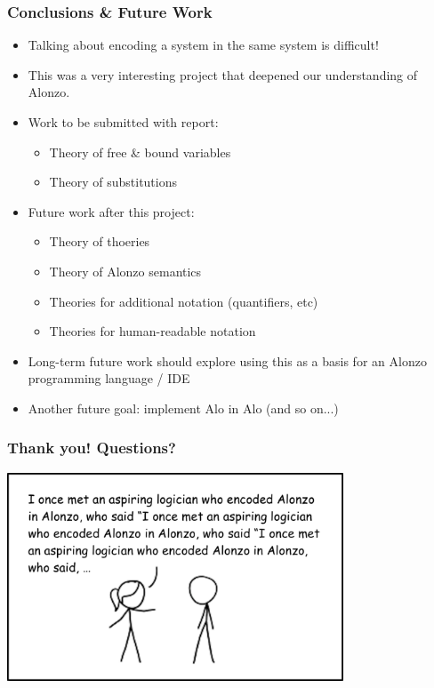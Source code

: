 \documentclass[xcolor={dvipsnames}]{beamer}
\begin{document}
\begin{frame}
\frametitle{Conclusions \& Future Work}
\begin{itemize}
\item Talking about encoding a system in the same system is difficult!
\item This was a very interesting project that deepened our understanding of Alonzo.
\item Work to be submitted with report:
\begin{itemize}
    \item Theory of free \& bound variables
    \item Theory of substitutions
\end{itemize}
\item Future work after this project:
\begin{itemize}
    \item Theory of thoeries
    \item Theory of Alonzo semantics
    \item Theories for additional notation (quantifiers, etc)
    \item Theories for human-readable notation
\end{itemize}
\item Long-term future work should explore using this as a basis for an Alonzo programming language / IDE
\item Another future goal: implement Alo in Alo (and so on...) \smiley{}
\end{itemize}
\end{frame}

\begin{frame}
\centering
\frametitle{Thank you! Questions?}
\includegraphics[width=10cm]{Alonzo.png}
\end{frame}


\end{document}
